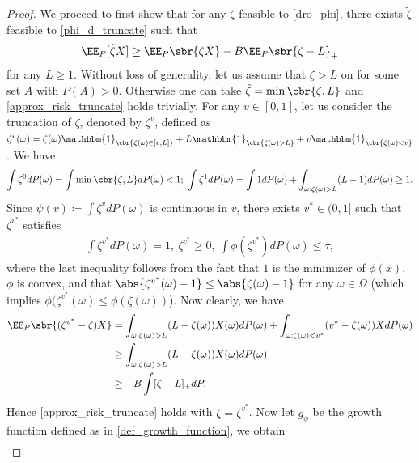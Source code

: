 \documentclass[9pt]{article} %
\numberwithin{equation}{section}
\begin{document}
\begin{proof}
We proceed to first show that for any $\zeta$ feasible to \eqref{dro_phi}, there exists $\tilde{\zeta}$ feasible to \eqref{phi_d_truncate} such that 
    \begin{align}\label{approx_risk_truncate}
     \EE_P [ \tilde{\zeta} X ]
    \geq \EE_P \sbr{\zeta X} - 
    B \EE_P \sbr{\zeta - L}_+
    \end{align}
for any $L \geq 1 $.
Without loss of generality, let us assume that $\zeta > L$ on for some set $A$ with $P(A) > 0$.     
Otherwise one can take $\tilde{\zeta} = \min \cbr{\zeta, L}$ and \eqref{approx_risk_truncate} holds trivially. 
For any $v \in [0,1]$, let us consider the truncation of $\zeta$, denoted by $\zeta^v$, defined as
$
\zeta^v(\omega) = \zeta(\omega) \mathbbm{1}_{\cbr{\zeta(\omega) \in [v, L]}}
+ L \mathbbm{1}_{\cbr{\zeta (\omega) > L }}
+ v \mathbbm{1}_{\cbr{\zeta(\omega) < v}}
$.
We have 
\begin{align*}
\int \zeta^0 dP(\omega) = \int \min \cbr{\zeta, L} dP(\omega) < 1; ~
\int \zeta^1 dP(\omega) = \int 1 d P (\omega)  + \int_{\omega: \zeta(\omega) > L} (L-1) dP(\omega) \geq 1. 
\end{align*}
Since $\psi(v) \coloneqq \int \zeta^v dP(\omega)$ is continuous in $v$,  there exists $v^* \in (0,1]$ such that 
$ \zeta^{v^*}$ satisfies 
\begin{align*}
\int  \zeta^{v^*} dP(\omega) = 1, ~  \zeta^{v^*} \geq 0, ~ \int \phi( \zeta^{v^*}) dP(\omega) \leq \tau,
\end{align*}
where the last inequality follows from the fact that $1$ is the minimizer of $\phi(x)$, $\phi$ is convex, and 
that $\abs{\zeta^{v^*}(\omega) - 1} \leq \abs{\zeta(\omega) - 1}$ for any $\omega \in \Omega$ (which implies $\phi(\zeta^{v^*}(\omega) \leq \phi(\zeta(\omega))$). 
Now clearly, we have 
\begin{align*}
\EE_P \sbr{ ( \zeta^{v^*} - \zeta )X } 
& = \int_{\omega: \zeta(\omega) > L} (L - \zeta(\omega) )X (\omega) dP(\omega)
+ \int_{\omega: \zeta(\omega) < v^*} (v^* - \zeta(\omega)) X  dP(\omega)  \\
& \geq \int_{\omega: \zeta(\omega) > L} (L - \zeta(\omega) )X (\omega) dP(\omega) \\ 
& \geq - B \int [\zeta - L]_+ dP.
\end{align*}
Hence \eqref{approx_risk_truncate} holds with $\tilde{\zeta} = \zeta^{v^*}$. 
Now let $g_\phi$ be the growth function defined as in \eqref{def_growth_function}, we obtain 
\begin{align}\label{prob_mass_truncate}

\end{align}
\end{proof}
\end{document}
